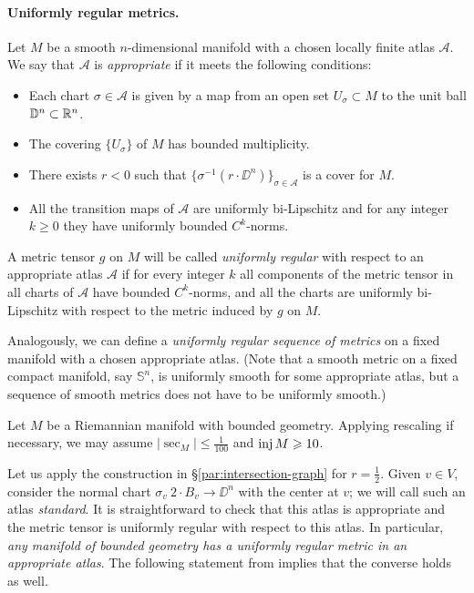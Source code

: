\documentclass[a4paper,10pt]{article}
\begin{document}
\paragraph{Uniformly regular metrics.}
\label{par:uniformly-regular}
Let $M$ be a smooth $n$-dimensional manifold with a chosen locally finite atlas $\mathcal{A}$.
We say that $\mathcal{A}$ is \emph{appropriate} if it meets the following conditions:
\begin{itemize}
\item Each chart $\sigma\in \mathcal{A}$ is given by a map from an open set $U_\sigma\subset M$ to the unit ball $\mathbb{D}^n\subset \mathbb{R}^n$.
\item The covering $\{U_\sigma\}$ of $M$ has bounded multiplicity.
\item There exists $r<0$ such that $\{\sigma^{-1}(r\cdot \DD^n)\}_{\sigma\in\mathcal{A}}$ is a cover for $M$.
\item All the transition maps of $\mathcal{A}$ are uniformly bi-Lipschitz and for any integer $k\ge 0$ they  have uniformly bounded $C^k$-norms. 
\end{itemize}

A metric tensor $g$ on $M$ will be called \emph{uniformly regular} with respect to an appropriate atlas $\mathcal{A}$
if for every integer $k$ all components of the metric tensor in all charts of $\mathcal{A}$ have bounded $C^k$-norms,
and all the charts are uniformly bi-Lipschitz with respect to the metric induced by $g$ on $M$. 

Analogously, we can define a \emph{uniformly regular sequence of metrics} on a fixed manifold with a chosen appropriate atlas.
(Note that a smooth metric on a fixed compact manifold, say $\mathbb{S}^n$, is uniformly smooth for some appropriate atlas,
but a sequence of smooth metrics does not have to be uniformly smooth.)

Let $M$ be a Riemannian manifold with bounded geometry.
Applying rescaling if necessary, we may assume $|\sec_M|\le \tfrac1{100}$ and $\operatorname{\rm inj} M\geqslant 10$.

Let us apply the construction in §\ref{par:intersection-graph} for $r=\tfrac12$.
Given $v\in V$, consider the normal chart $\sigma_v\:2\cdot B_v\to\DD^n$ with the center at $v$;
we will call such an atlas \emph{standard}.
It is straightforward to check that this atlas is appropriate and
the metric tensor is uniformly regular with respect to this atlas.
In particular, \textit{any manifold of bounded geometry has a uniformly regular metric in an appropriate atlas}.
The following statement from \cite{disconzi-shao-simonett} implies that the converse holds as well.
\end{document}
